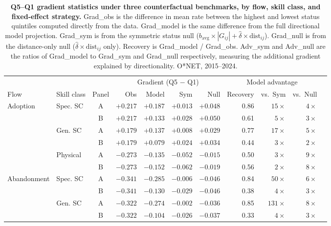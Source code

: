 \begin{table}[H]
\centering
\caption{\textbf{Q5--Q1 gradient statistics under three counterfactual benchmarks, by flow, skill class, and fixed-effect strategy.} Grad\_obs is the difference in mean rate between the highest and lowest status quintiles computed directly from the data. Grad\_model is the same difference from the full directional model projection. Grad\_sym is from the symmetric status null ($b_{\mathrm{avg}} \times |G_{ij}| + \hat{\delta} \times \mathrm{dist}_{ij}$). Grad\_null is from the distance-only null ($\hat{\delta} \times \mathrm{dist}_{ij}$ only). Recovery is Grad\_model / Grad\_obs. Adv\_sym and Adv\_null are the ratios of Grad\_model to Grad\_sym and Grad\_null respectively, measuring the additional gradient explained by directionality. O*NET, 2015--2024.}
\label{tab:SI_gradients}
\renewcommand{\arraystretch}{1.15}
\begin{tabular}{llcrrrrrrrr}
\toprule
 & & & \multicolumn{4}{c}{Gradient (Q5 $-$ Q1)} & \multicolumn{3}{c}{Model advantage} \\
\cmidrule(lr){4-7} \cmidrule(lr){8-10}
Flow & Skill class & Panel & Obs & Model & Sym & Null & Recovery & vs.\ Sym & vs.\ Null \\
\midrule
Adoption
 & Spec. SC   & A & $+0.217$ & $+0.187$ & $+0.013$ & $+0.048$ & 0.86 & $15\times$ & $4\times$ \\
 &            & B & $+0.217$ & $+0.133$ & $+0.028$ & $+0.050$ & 0.61 & $5\times$ & $3\times$ \\
\cmidrule(lr){2-10}
 & Gen. SC    & A & $+0.179$ & $+0.137$ & $+0.008$ & $+0.029$ & 0.77 & $17\times$ & $5\times$ \\
 &            & B & $+0.179$ & $+0.079$ & $+0.024$ & $+0.034$ & 0.44 & $3\times$ & $2\times$ \\
\cmidrule(lr){2-10}
 & Physical   & A & $-0.273$ & $-0.135$ & $-0.052$ & $-0.015$ & 0.50 & $3\times$ & $9\times$ \\
 &            & B & $-0.273$ & $-0.152$ & $-0.062$ & $-0.019$ & 0.56 & $2\times$ & $8\times$ \\
\midrule
Abandonment
 & Spec. SC   & A & $-0.341$ & $-0.285$ & $-0.006$ & $-0.046$ & 0.84 & $50\times$ & $6\times$ \\
 &            & B & $-0.341$ & $-0.130$ & $-0.029$ & $-0.046$ & 0.38 & $4\times$ & $3\times$ \\
\cmidrule(lr){2-10}
 & Gen. SC    & A & $-0.322$ & $-0.274$ & $-0.002$ & $-0.036$ & 0.85 & $131\times$ & $8\times$ \\
 &            & B & $-0.322$ & $-0.104$ & $-0.026$ & $-0.037$ & 0.33 & $4\times$ & $3\times$ \\

\end{tabular}
\end{table}
